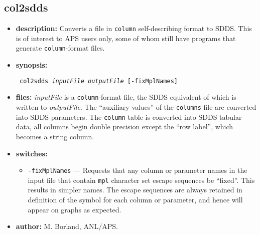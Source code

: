 \newpage
\subsection{col2sdds}
\label{col2sdds}

\begin{itemize}
\item {\bf description:}
Converts a file in \verb|column| self-describing format to SDDS.  This is of interest to
APS users only, some of whom still have programs that generate \verb|column|-format files.
\item {\bf synopsis:} 
\begin{flushleft}{\tt
col2sdds {\em inputFile} {\em outputFile} [-fixMplNames]
}\end{flushleft}
\item {\bf files:}
{\em inputFile} is a {\tt column}-format file, the SDDS equivalent of which is written to {\em outputFile}.
The ``auxiliary values'' of the {\tt columns} file are converted into SDDS parameters.  The {\tt column} table
is converted into SDDS tabular data, all columns begin double precision except the ``row label'', which
becomes a string column.
\item {\bf switches:}
    \begin{itemize}
    \item \verb|-fixMplNames| --- Requests that any column or parameter names in the input file that contain
        \verb|mpl| character set escape sequences be ``fixed''.  This results in simpler names.  The escape sequences
        are always retained in definition of the symbol for each column or parameter, and hence will appear on
        graphs as expected.
    \end{itemize}
\item {\bf author:} M. Borland, ANL/APS.
\end{itemize}

